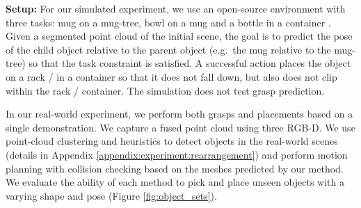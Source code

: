 \documentclass{article}
\begin{document}
\begin{table}[t!]
    \centering
    \caption{Success rates of \hl{real-world} pick-and-place experiments with a single demonstration. The manipulated object (e.g. a mug) starts in an arbitrary pose (we use a stand to get a range of poses) and the target object (e.g. a mug-tree) starts in an arbitrary upright pose. $^1$The target object (e.g. the mug tree) is in a fixed pose for this experiment, as NDF does not handle target object variation. Each entry is measured over 25 - 30 trials with unseen object pairs.}
    \label{tab:real_world}
\end{table}

\textbf{Setup:} For our simulated experiment, we use an open-source environment with three tasks: mug on a mug-tree, bowl on a mug and a bottle in a  container \cite{simeonov22se}. Given a segmented point cloud of the initial scene, the goal is to predict the pose of the child object relative to the parent object (e.g.~the mug relative to the mug-tree) so that the task constraint is satisfied. A successful action places the object on a rack / in a container so that it does not fall down, but also does not clip within the rack / container. The simulation does not test grasp prediction.

In our real-world experiment, we perform both grasps and placements based on a single demonstration. We capture a fused point cloud using three RGB-D. We use point-cloud clustering and heuristics to detect objects in the real-world scenes (details in Appendix \ref{appendix:experiment:rearrangement}) and perform motion planning with collision checking based on the meshes predicted by our method. We evaluate the ability of each method to pick and place unseen objects with a varying shape and pose (Figure \ref{fig:object_sets}).
\end{document}
